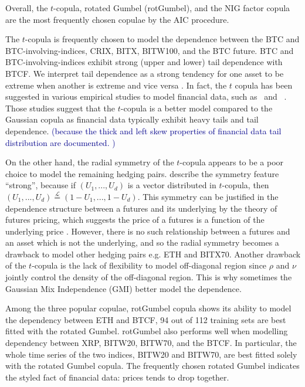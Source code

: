 Overall, the $t$-copula, rotated Gumbel (rotGumbel), and the NIG
factor copula are the most frequently chosen copulae by the AIC
procedure.

The $t$-copula is frequently chosen to model the dependence between
the BTC and BTC-involving-indices, CRIX, BITX, BITW100, and the BTC
future.
BTC and BTC-involving-indices exhibit strong (upper and lower) tail
dependence with BTCF.  We interpret tail dependence as a strong
tendency for one asset to be extreme when another is extreme and
vice versa \citep{McNeil2015}.
In fact, the $t$ copula has been suggested in various empirical
studies to model financial data, such as~\cite{zeevi2002beyond} and~
\cite{breymann2003dependence}.
Those studies suggest that the $t$-copula is a better model compared
to the Gaussian copula as financial data typically exhibit heavy tails
and tail dependence. \textcolor{darkblue}{(because the thick and left
  skew  properties of financial data tail distribution are documented. )}
\medskip

On the other hand, the radial symmetry of the $t$-copula appears to be
a poor choice to model the remaining hedging pairs.
\cite{demarta2005t} describe the symmetry feature ``strong'', because if
$(U_1, ..., U_d)$ is a vector distributed in $t$-copula,
then $(U_1, ..., U_d) \overset{\mathcal{L}}= (1-U_1, ...,
1-U_d)$. 
This symmetry can be justified in the dependence structure between a
futures and its underlying by the theory of futures pricing,
which suggests the price of a futures is a function of the underlying
price \citep{hull2003options}.
However, there is no such relationship between a futures and an asset
which is not the underlying, and so the radial symmetry becomes a
drawback to model other hedging pairs e.g. ETH and BITX70.
Another drawback of the $t$-copula is the lack of flexibility to model
off-diagonal region since $\rho$ and $\nu$ jointly control the density
of the off-diagonal region.
This is why sometimes the Gaussian Mix Independence (GMI) better model
the dependence.  

Among the three popular copulae, rotGumbel copula shows its ability to model the dependency between ETH and BTCF,
94 out of 112 training sets are best fitted with the rotated Gumbel.
rotGumbel also performs well when modelling dependency between XRP, BITW20, BITW70, and the BTCF.
In particular, the whole time series of the two indices, BITW20 and BITW70, are best fitted solely with the rotated Gumbel copula.
The frequently chosen rotated Gumbel indicates the styled fact of
financial data: prices tends to drop together.  

